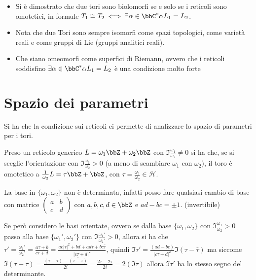 
\begin{osservazione}
\begin{itemize}
\item Si è dimostrato che due tori sono biolomorfi se e solo se i reticoli sono omotetici, in formule $T_1\cong T_2 \iff \exists \alpha\in\bbC^* \alpha L_1=L_2$.
\item Nota che due Tori sono sempre isomorfi come spazi topologici, come varietà reali e come gruppi di Lie (gruppi analitici reali).
\item Che siano omeomorfi come superfici di Riemann, ovvero che i reticoli soddisfino $\exists \alpha\in\bbC^* \alpha L_1=L_2$  è una condizione molto forte 
\end{itemize}
\end{osservazione}


\section{Spazio dei parametri}
Si ha che la condizione sui reticoli ci permette di analizzare lo spazio di parametri per i tori.

Preso un reticolo generico $L=\omega_1 \bbZ + \omega_2 \bbZ$ con $\Im \frac{\omega_1}{\omega_2} \ne 0$ si ha che, se si sceglie l'orientazione con $\Im \frac{\omega_1}{\omega_2}>0$ (a meno di scambiare $\omega_1$ con $\omega_2$), il toro è omotetico a $\frac{1}{\omega_2} L= \tau \bbZ+ \bbZ$, con $\tau=\frac{\omega_1}{\omega_2} \in \mathcal{H}$. 

La base in $\{\omega_1, \omega_2 \}$ non è determinata, infatti posso fare qualsiasi cambio di base con matrice $	\begin{pmatrix} a & b \\ c & d \end{pmatrix}$ con $a,b,c,d \in \bbZ$ e $ad-bc=\pm 1$. (invertibile)

Se però considero le basi orientate, ovvero se dalla base $\{\omega_1, \omega_2 \}$ con $\Im \frac{\omega_1}{\omega_2}>0$ passo alla base $\{\omega_1', \omega_2' \}$ con $\Im \frac{\omega_1'}{\omega_2'}>0$, allora si ha che $\tau'=\frac{\omega_1'}{\omega_2'}=\frac{a\tau +b}{c\tau+d}=\frac{ac |\tau |^2+bd+ad\tau +bc \bar\tau}{|c\tau+d|^2}$, quindi $\Im\tau'=\frac{(ad-bc)}{ |c\tau+d|^2} \Im(\tau-\bar\tau)$ ma siccome $\Im(\tau-\bar\tau)=\frac{(\tau-\bar\tau)-\overline{(\tau-\bar\tau)}}{2i}=\frac{2\tau-2\bar\tau}{2i}=2(\Im\tau)$ allora $\Im\tau'$ ha lo stesso segno del determinante.

